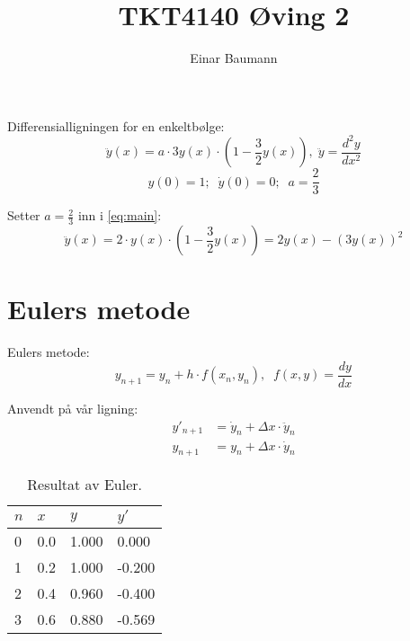 



\author{Einar Baumann}
\title{TKT4140 Øving 2}
\maketitle

Differensialligningen for en enkeltbølge:
\begin{equation}
  \ddot y(x) = a\cdot 3y(x)\cdot \left( 1 - \frac{3}{2}y(x) \right) \label{eq:main}, \; \ddot y = \frac{d^2 y}{dx^2}
\end{equation}
\begin{equation*}
  y(0) = 1; \;\; \dot y(0) = 0; \;\; a = \frac{2}{3}
\end{equation*}

\noindent Setter $a=\frac{2}{3}$ inn i \eqref{eq:main}:
\begin{equation}
  \ddot y(x) = 2 \cdot y(x)\cdot \left( 1 - \frac{3}{2}y(x) \right)
             = 2y(x) - \left( 3y(x) \right)^2
\end{equation}

\clearpage

\section{Eulers metode} %
\label{sec:eulers_metode}
\noindent Eulers metode:
\begin{equation}
  y_{n+1} = y_n + h \cdot f(x_n, y_n), \;\; f(x,y) = \frac{dy}{dx}
\end{equation}

\noindent Anvendt på vår ligning:
\begin{align}
  y'_{n+1} & = \dot y_n + \Delta x \cdot \ddot y_n \\
  y_{n+1} & = y_n + \Delta x \cdot \dot y_n
\end{align}

\begin{table}[H]
  \centering
  \caption{Resultat av Euler.}
  \label{tab:euler}
  \begin{tabularx}{0.5\textwidth}{XXXX}
    \toprule
    $n$   & $x$   & $y$   & $y'$ \\
    \midrule
    0     & 0.0   & 1.000 & 0.000  \\
    1     & 0.2   & 1.000 & -0.200 \\
    2     & 0.4   & 0.960 & -0.400 \\
    3     & 0.6   & 0.880 & -0.569 \\
    \bottomrule
  \end{tabularx}
\end{table}

